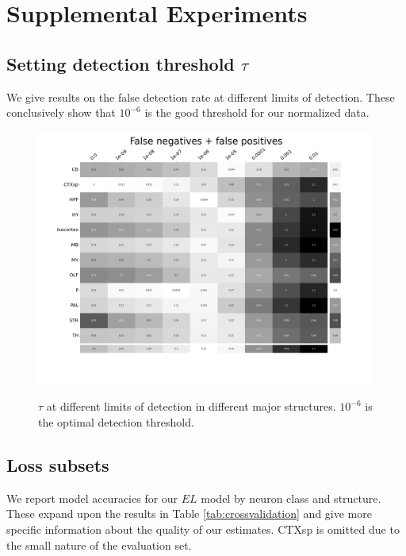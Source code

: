 \newpage

\section{Supplemental Experiments}
\label{supp_sec:exp}

\subsection{Setting detection threshold $\tau$}
\label{supp:exp_lower}

We give results on the false detection rate at different limits of detection.
These conclusively show that $10^{-6}$ is the good threshold for our normalized data.
\begin{figure}[H]
    \centering
    \includegraphics[width = 7in]{figs/Threshold.png}
    \label{fig:threshold}
    \caption{$\tau$ at different limits of detection in different major structures.  $10^{-6}$ is the optimal detection threshold.}
\end{figure}

\newpage

\subsection{Loss subsets}
\label{supp_sec:loss_subsets}

We report model accuracies for our $EL$ model by neuron class and structure.
These expand upon the results in Table \ref{tab:crossvalidation} and give more specific information about the quality of our estimates.   CTXsp is omitted due to the small nature of the evaluation set.


